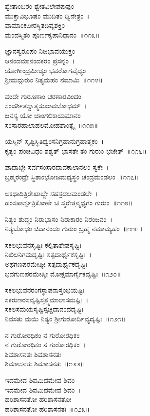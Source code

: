 ಶ್ವೇತಾಂಬರಂ ಶ್ವೇತವಿಲೇಪಪುಷ್ಪಂ\\ ಮುಕ್ತಾವಿಭೂಷಂ ಮುದಿತಂ ದ್ವಿನೇತ್ರಂ~।\\
ವಾಮಾಂಕಪೀಠಸ್ಥಿತದಿವ್ಯಶಕ್ತಿಂ\\ ಮಂದಸ್ಮಿತಂ ಪೂರ್ಣಕೃಪಾನಿಧಾನಂ~॥೧೧೩॥

ಜ್ಞಾನಸ್ವರೂಪಂ ನಿಜಭಾವಯುಕ್ತಂ\\ ಆನಂದಮಾನಂದಕರಂ ಪ್ರಸನ್ನಂ~।\\
ಯೋಗೀಂದ್ರಮೀಡ್ಯಂ ಭವರೋಗವೈದ್ಯಂ\\ ಶ್ರೀಮದ್ಗುರುಂ ನಿತ್ಯಮಹಂ ನಮಾಮಿ~॥೧೧೪॥

ವಂದೇ ಗುರೂಣಾಂ ಚರಣಾರವಿಂದಂ\\ ಸಂದರ್ಶಿತಸ್ವಾತ್ಮಸುಖಾವಬೋಧಮ್~।\\
ಜನಸ್ಯ ಯೋ ಜಾಂಗಲಿಕಾಯಮಾನಂ \\ಸಂಸಾರಹಾಲಾಹಲಮೋಹಶಾಂತ್ಯೈ~॥೧೧೫॥

ಯಸ್ಮಿನ್ ಸೃಷ್ಟಿಸ್ಥಿತಿಧ್ವಂಸನಿಗ್ರಹಾನುಗ್ರಹಾತ್ಮಕಂ~।\\
ಕೃತ್ಯಂ ಪಂಚವಿಧಂ ಶಶ್ವತ್ ಭಾಸತೇ ತಂ ಗುರುಂ ಭಜೇತ್~॥೧೧೬॥

ಪಾದಾಬ್ಜೇ ಸರ್ವಸಂಸಾರದಾವಕಾಲಾನಲಂ ಸ್ವಕೇ~।\\
ಬ್ರಹ್ಮರಂಧ್ರೇ ಸ್ಥಿತಾಂಭೋಜಮಧ್ಯಸ್ಥಂ ಚಂದ್ರಮಂಡಲಂ~॥೧೧೭॥

ಅಕಥಾದಿತ್ರಿರೇಖಾಬ್ಜೇ ಸಹಸ್ರದಲಮಂಡಲೇ~।\\
ಹಂಸಪಾರ್ಶ್ವತ್ರಿಕೋಣೇ ಚ ಸ್ಮರೇತ್ತನ್ಮಧ್ಯಗಂ ಗುರುಂ~॥೧೧೮॥

ನಿತ್ಯಂ ಶುದ್ಧಂ ನಿರಾಭಾಸಂ ನಿರಾಕಾರಂ ನಿರಂಜನಂ~।\\
ನಿತ್ಯಬೋಧಂ ಚಿದಾನಂದಂ ಗುರುಂ ಬ್ರಹ್ಮ ನಮಾಮ್ಯಹಂ~॥೧೧೯॥

ಸಕಲಭುವನಸೃಷ್ಟಿಃ ಕಲ್ಪಿತಾಶೇಷಸೃಷ್ಟಿಃ\\
ನಿಖಿಲನಿಗಮದೃಷ್ಟಿಃ ಸತ್ಪದಾರ್ಥೈಕಸೃಷ್ಟಿಃ~।\\
ಅಥಗಣಪರಮೇಷ್ಠೀ ಸತ್ಪದಾರ್ಥೈಕದೃಷ್ಟಿಃ\\
ಭವಗುಣಪರಮೇಷ್ಠೀ ಮೋಕ್ಷಮಾರ್ಗೈಕದೃಷ್ಟಿಃ~॥೧೨೦॥

ಸಕಲಭುವನರಂಗಸ್ಥಾಪನಾಸ್ತಂಭಯಷ್ಟಿಃ\\
ಸಕರುಣರಸವೃಷ್ಟಿಸ್ತತ್ತ್ವಮಾಲಾಸಮಷ್ಟಿಃ~।\\
ಸಕಲಸಮಯಸೃಷ್ಟಿಸ್ಸಚ್ಚಿದಾನಂದದೃಷ್ಟಿಃ\\
ನಿವಸತು ಮಯಿ ನಿತ್ಯಂ ಶ್ರೀಗುರೋರ್ದಿವ್ಯದೃಷ್ಟಿಃ~॥೧೨೧॥

ನ ಗುರೋರಧಿಕಂ ನ ಗುರೋರಧಿಕಂ\\ ನ ಗುರೋರಧಿಕಂ ನ ಗುರೋರಧಿಕಂ~।\\
ಶಿವಶಾಸನತಃ ಶಿವಶಾಸನತಃ \\ಶಿವಶಾಸನತಃ ಶಿವಶಾಸನತಃ~॥೧೨೨॥

ಇದಮೇವ ಶಿವಮಿದಮೇವ ಶಿವಂ\\ ಇದಮೇವ ಶಿವಮಿದಮೇವ ಶಿವಂ~।\\
ಹರಿಶಾಸನತೋ ಹರಿಶಾಸನತೋ\\ ಹರಿಶಾಸನತೋ ಹರಿಶಾಸನತಃ~॥೧೨೩॥

